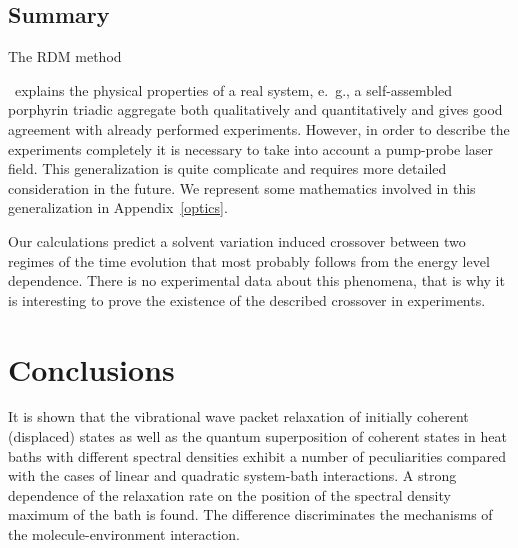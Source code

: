 \documentclass[12pt,twoside,a4paper]{report}
\begin{document}
\section{Summary} \label{non-fluo-conclusions} 
The RDM method
{\ explains the physical properties of a real system, e.~g.,
a self-assembled porphyrin triadic aggregate both 
qualitatively and quantitatively and gives 
good agreement with already performed experiments. 
However, in order to  describe the experiments completely it is 
necessary to take into account a pump-probe laser field. 
This generalization 
is quite complicate and requires more detailed consideration in the future. 
We represent some mathematics involved in this generalization in  
Appendix~\ref{optics}. 
 
Our calculations predict 
a solvent variation induced crossover 
between two regimes of the time evolution
that most probably follows from the energy level dependence. 
There is no experimental data about this phenomena, 
that is why it is interesting to prove the existence of the 
described crossover in experiments. 



\chapter*{}
\chapter{Conclusions}
%





  It is shown that the vibrational wave packet relaxation of initially
  coherent (displaced) states as well as the quantum superposition of
  coherent states in heat baths with different spectral densities 
  exhibit a number of peculiarities 
  compared with the cases of linear 
  and  quadratic system-bath interactions.
  A strong dependence of the relaxation rate 
  on the position of the spectral density
  maximum of the bath is found. 
  The difference
  discriminates the mechanisms of the molecule-environment
  interaction.








}
\end{document}

